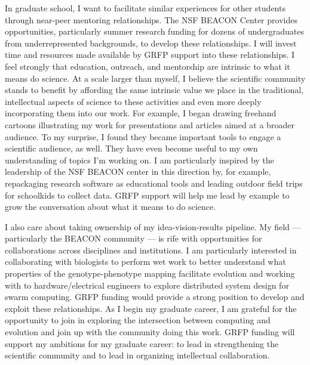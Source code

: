 In graduate school, I want to facilitate similar experiences for other students through near-peer mentoring relationships.
The NSF BEACON Center provides opportunities, particularly summer research funding for dozens of undergraduates from underrepresented backgrounds, to develop these relationships.
I will invest time and resources made available by GRFP support into these relationships.
I feel strongly that education, outreach, and mentorship are intrinsic to what it means do science.
At a scale larger than myself, I believe the scientific community stands to benefit by affording the same intrinsic value we place in the traditional, intellectual aspects of science to these activities and even more deeply incorporating them into our work.
For example, I began drawing freehand cartoons illustrating my work for presentations and articles aimed at a broader audience.
To my surprise, I found they became important tools to engage a scientific audience, as well.
They have even become useful to my own understanding of topics I'm working on.
I am particularly inspired by the leadership of the NSF BEACON center in this direction by, for example, repackaging research software as educational tools and leading outdoor field trips for schoolkids to collect data.
GRFP support will help me lead by example to grow the conversation about what it means to do science.

I also care about taking ownership of my idea-vision-results pipeline.
My field --- particularly the BEACON community --- is rife with opportunities for collaborations across disciplines and institutions.
I am particularly interested in collaborating with biologists to perform wet work to better understand what properties of the genotype-phenotype mapping facilitate evolution and working with to hardware/electrical engineers to explore distributed system design for swarm computing.
GRFP funding would provide a strong position to develop and exploit these relationships.
As I begin my graduate career, I am grateful for the opportunity to join in exploring the intersection between computing and evolution and join up with the community doing this work.
GRFP funding will support my ambitions for my graduate career: to lead in strengthening the scientific community and to lead in organizing intellectual collaboration.
